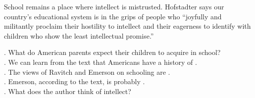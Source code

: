 School remains a place where intellect is mistrusted. Hofstadter says our country’s educational system is in the grips of people who “joyfully and militantly proclaim their hostility to intellect and their eagerness to identify with children who show the least intellectual promise.”
\begin{questions}  .	What do American parents expect their children to acquire in school?\\
 .	We can learn from the text that Americans have a history of \ltk{}.\\
 .	The views of Ravitch and Emerson on schooling are \ltk{}.\\
 .	Emerson, according to the text, is probably \ltk{}.\\
 .	What does the author think of intellect?\\
\end{questions}